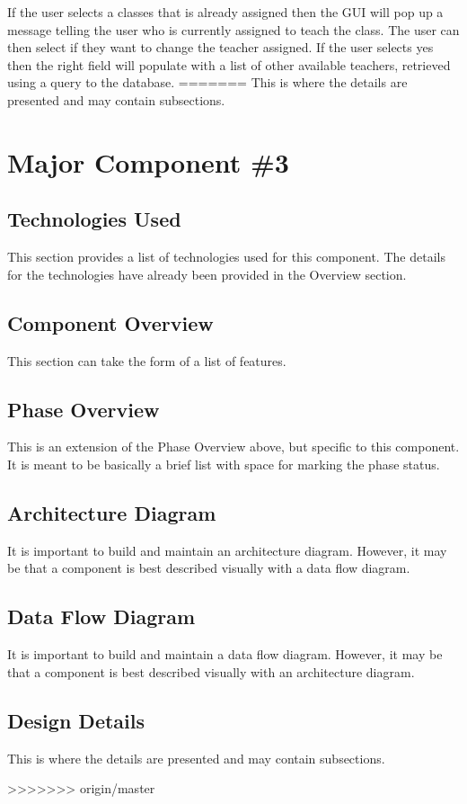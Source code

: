 If the user selects a classes that is already assigned then the GUI will pop up a message telling the user who is currently assigned to teach the class. The user can then select if they want to change the teacher assigned. If the user selects yes then the right field will populate with a list of other available teachers, retrieved using a query to the database.
=======
This is where the details are presented and may contain subsections. 


\section{Major Component \#3 }

\subsection{Technologies  Used}
This section provides a list of technologies used for this component.  The details 
for the technologies have already been provided in the Overview section. 

\subsection{Component  Overview}
This section can take the form of a list of features. 

\subsection{Phase Overview}
This is an extension of the Phase Overview above, but specific to this component. 
 It is meant to be basically a brief list with space for marking the phase status. 

\subsection{ Architecture  Diagram}
It is important to build and maintain an architecture diagram.  However, it may 
be that a component is best described visually with a data flow diagram. 


\subsection{Data Flow Diagram}
It is important to build and maintain a data flow diagram.  However, it may be 
that a component is best described visually with an architecture diagram. 


\subsection{Design Details}
This is where the details are presented and may contain subsections. 

>>>>>>> origin/master

